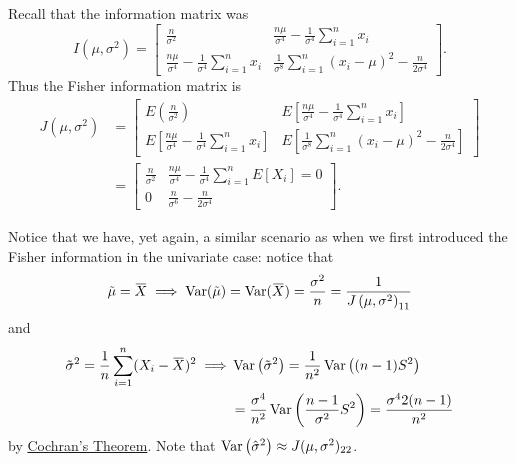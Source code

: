 \documentclass[notoc,notitlepage]{tufte-book}
\begin{document}
\begin{solution}
  Recall that the information matrix was
  \begin{equation*}
    I\left(\mu, \sigma^2\right) = \begin{bmatrix}
      \frac{n}{\sigma^2} & \frac{n\mu}{\sigma^4} - \frac{1}{\sigma^4} \sum_{i=1}^{n} x_i \\
      \frac{n\mu}{\sigma^4} - \frac{1}{\sigma^4} \sum_{i=1}^{n} x_i & \frac{1}{\sigma^8} \sum_{i=1}^{n} (x_i - \mu)^2 - \frac{n}{2\sigma^4}
    \end{bmatrix}.
  \end{equation*}
  Thus the Fisher information matrix is
  \begin{align*}
    J\left(\mu, \sigma^2\right) &= \begin{bmatrix}
      E\left( \frac{n}{\sigma^2} \right) & E\left[ \frac{n\mu}{\sigma^4} - \frac{1}{\sigma^4} \sum_{i=1}^{n} x_i \right] \\
      E\left[ \frac{n\mu}{\sigma^4} - \frac{1}{\sigma^4} \sum_{i=1}^{n} x_i \right] & E\left[ \frac{1}{\sigma^8} \sum_{i=1}^{n} (x_i - \mu)^2 - \frac{n}{2 \sigma^4} \right]
    \end{bmatrix} \\
    &= \begin{bmatrix}
    \frac{n}{\sigma^2} & \frac{n \mu}{\sigma^4} - \frac{1}{\sigma^4} \sum_{i=1}^{n} E[X_i] = 0 \\
    0 & \frac{n}{\sigma^6} - \frac{n}{2\sigma^4}
    \end{bmatrix}.
  \end{align*}
\end{solution}

\begin{note}
  Notice that we have, yet again, a similar scenario as when we first introduced the Fisher information in the univariate case: notice that
  \begin{equation*}
    \tilde{\mu} = \bar{X} \implies \Var(\tilde{\mu}) = \Var(\bar{X}) = \frac{\sigma^2}{n} = \frac{1}{J\left(\mu, \sigma^2\right)_{11}}
  \end{equation*}
  and
  \begin{align*}
    \tilde{\sigma}^2 = \frac{1}{n} \sum_{i=1}^{n} (X_i - \bar{X})^2 \implies& \Var\left(\tilde{ \sigma }^2\right) = \frac{1}{n^2} \Var\left((n - 1)S^2\right) \\
                                                                            &= \frac{\sigma^4}{n^2} \Var\left(\frac{n - 1}{\sigma^2} S^2\right) = \frac{\sigma^4 2(n - 1)}{n^2}
  \end{align*}
  by \hyperref[thm:properties_of_the_gaussian_distribution]{Cochran's Theorem}. Note that $\operatorname{Var}\left(\hat{\sigma}^2\right) \approx J(\mu, \sigma^2)_{22}$.
\end{note}
\end{document}
